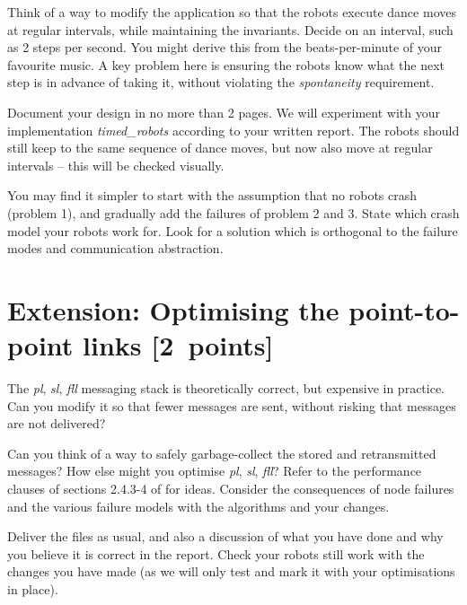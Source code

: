 \documentclass[a4paper]{article}
\begin{document}
Think of a way to modify the application so that the robots execute dance
moves at regular intervals, while maintaining the invariants. Decide on an
interval, such as 2 steps per second. You might derive this from the
beats-per-minute of your favourite music. A key problem here is ensuring the
robots know what the next step is in advance of taking it, without violating
the \emph{spontaneity} requirement.

Document your design in no more than 2 pages. We will experiment with your
implementation \emph{timed\_robots} according to your written report.
The robots should still keep to the same sequence of dance moves, but now also
move at regular intervals -- this will be checked visually.

You may find it simpler to start with the assumption that no robots crash
(problem 1), and gradually add the failures of problem 2 and 3. State which
crash model your robots work for. Look for a solution which is orthogonal to
the failure modes and communication abstraction.







\section*{Extension: Optimising the point-to-point links [2~points]} %
\label{sec:extension_optimising_the_link_channels}

The \emph{pl}, \emph{sl}, \emph{fll} messaging stack is theoretically correct,
but expensive in practice. Can you modify it so that fewer messages are sent,
without risking that messages are not delivered?

Can you think of a way to safely garbage-collect the stored and retransmitted
messages? How else might you optimise \emph{pl}, \emph{sl}, \emph{fll}? Refer to the
performance clauses of sections 2.4.3-4 of \cite{cachin2011} for ideas.
Consider the consequences of node failures and the various failure models
with the algorithms and your changes.

Deliver the files as usual, and also a discussion of what you have done and
why you believe it is correct in the report. Check your robots still work
with the changes you have made (as we will only test and mark it with your
optimisations in place).

\end{document}

